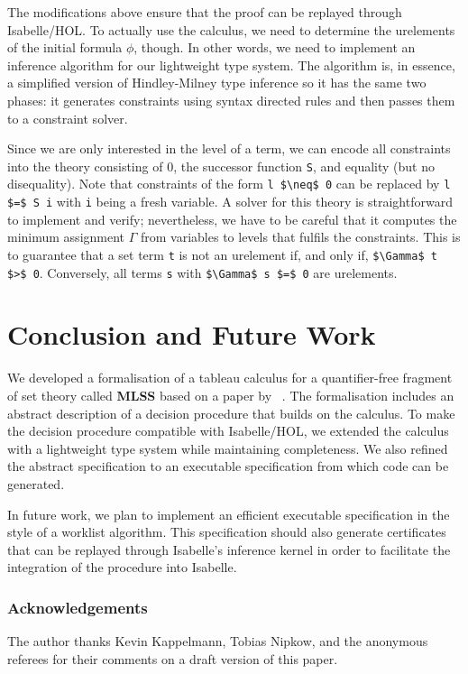 \documentclass[runningheads]{llncs}
\newcommand{\MLSS}{\textbf{MLSS}}
\begin{document}
The modifications above ensure that the proof can be replayed through Isabelle/HOL.
To actually use the calculus, we need to determine the urelements of the initial formula $\phi$, though.
In other words, we need to implement an inference algorithm for our lightweight type system.
The algorithm is, in essence, a simplified version of Hindley-Milney type inference so it has the same two phases:
it generates constraints using syntax directed rules and then passes them to a constraint solver.

Since we are only interested in the level of a term, we can encode all constraints into the theory consisting of $0$, the successor function \lstinline!S!, and equality (but no disequality).
Note that constraints of the form \lstinline!l $\neq$ 0! can be replaced by \lstinline!l $=$ S i! with \lstinline!i! being a fresh variable.
A solver for this theory is straightforward to implement and verify;
nevertheless, we have to be careful that it computes the minimum assignment $\Gamma$ from variables to levels that fulfils the constraints. 
This is to guarantee that a set term \lstinline!t! is not an urelement if, and only if, \lstinline!$\Gamma$ t $>$ 0!.
Conversely, all terms \lstinline!s! with \lstinline!$\Gamma$ s $=$ 0! are urelements.

\section{Conclusion and Future Work}
We developed a formalisation of a tableau calculus for a quantifier-free fragment of set theory called \MLSS{} based on a paper by \citeauthor{new_fast_tableau}~\cite{new_fast_tableau}. 
The formalisation includes an abstract description of a decision procedure that builds on the calculus.
To make the decision procedure compatible with Isabelle/HOL, we extended the calculus with a lightweight type system while maintaining completeness.
We also refined the abstract specification to an executable specification from which code can be generated.

In future work, we plan to implement an efficient executable specification in the style of a worklist algorithm. 
This specification should also generate certificates that can be replayed through Isabelle's inference kernel in order to facilitate the integration of the procedure into Isabelle.


\subsubsection{Acknowledgements}
The author thanks Kevin Kappelmann, Tobias Nipkow, and the anonymous referees for their comments on a draft version of this paper.



\clearpage\listoftodos
\end{document}
